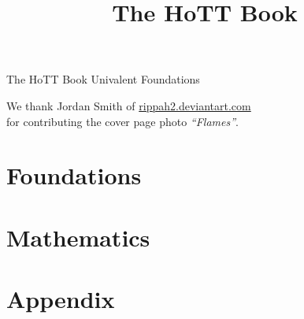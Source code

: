 \documentclass[openany,11pt]{book}
\begin{document}
\title{The HoTT Book}

%
\thispagestyle{empty}%
\vspace*{0.05\textheight}
{\centering
{\color{orange}\fontsize{70}{100}\selectfont The HoTT Book}
\vfill
{\color{orange}\fontsize{45}{60}\selectfont Univalent Foundations}\par
}
\vspace*{0.02\textheight}

\clearpage

\thispagestyle{empty}%
\hbox{}
\vfill
{\centering
  We thank Jordan Smith of \href{http://rippah2.deviantart.com/}{rippah2.deviantart.com}\\
  for contributing the cover page photo \emph{``Flames''}.\par}
\vspace*{0.05\textheight}
\clearpage

\restoregeometry



\tableofcontents



\part{Foundations}
\label{part:foundations}





%









\part{Mathematics}
\label{part:mathematics}









\part{Appendix}

\appendix








\end{document}
